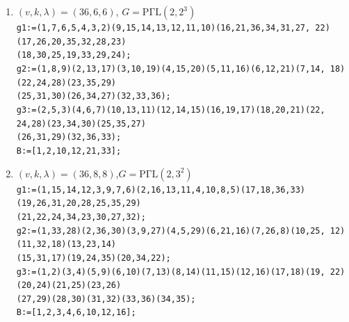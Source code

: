 \documentclass[a4paper,twopage,reqno,12pt]{amsart}
\theoremstyle{definition}
\numberwithin{equation}{section}
\newcommand{\PGaL}{\mathrm{P\Gamma L}}
\newcommand{\Aut}{\mathrm{Aut}}
\begin{document}
\begin{enumerate}
     \item\label{3666_3} $(v,k,\lambda)=(36,6,6)$, $G=\PGaL(2,2^3)$\\
      {\scriptsize \texttt{g1:=(1,7,6,5,4,3,2)(9,15,14,13,12,11,10)(16,21,36,34,31,27,
22)(17,26,20,35,32,28,23)\\(18,30,25,19,33,29,24);}\\
    \texttt{g2:=(1,8,9)(2,13,17)(3,10,19)(4,15,20)(5,11,16)(6,12,21)(7,14,
18)(22,24,28)(23,35,29)\\(25,31,30)(26,34,27)(32,33,36);}\\
    \texttt{g3:=(2,5,3)(4,6,7)(10,13,11)(12,14,15)(16,19,17)(18,20,21)(22,
24,28)(23,34,30)(25,35,27)\\(26,31,29)(32,36,33);}\\}
    \texttt{B:=[1,2,10,12,21,33];}\\

    \item\label{3688} $(v,k,\lambda)=(36,8,8)$,$G=\PGaL(2,3^2)$\\
    {\scriptsize \texttt{g1:=(1,15,14,12,3,9,7,6)(2,16,13,11,4,10,8,5)(17,18,36,33)(19,26,31,20,28,25,35,29)\\(21,22,24,34,23,30,27,32);}\\
    \texttt{g2:=(1,33,28)(2,36,30)(3,9,27)(4,5,29)(6,21,16)(7,26,8)(10,25,
12)(11,32,18)(13,23,14)\\(15,31,17)(19,24,35)(20,34,22);}\\
    \texttt{g3:=(1,2)(3,4)(5,9)(6,10)(7,13)(8,14)(11,15)(12,16)(17,18)(19,
22)(20,24)(21,25)(23,26)\\(27,29)(28,30)(31,32)(33,36)(34,35);}\\}
    \texttt{B:=[1,2,3,4,6,10,12,16];}\\


\end{enumerate}
\end{document}

